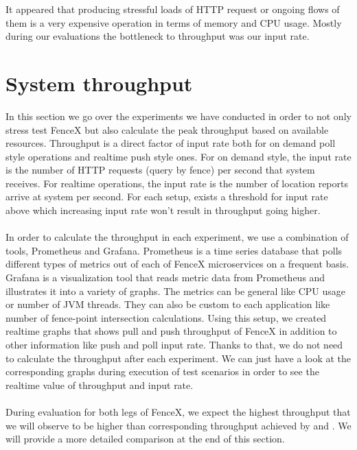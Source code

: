 \documentclass[a4]{report}
\begin{document}
    It appeared that producing stressful loads of HTTP request or ongoing flows of them is a very expensive operation
    in terms of memory and CPU usage.
    Mostly during our evaluations the bottleneck to throughput was our input rate.


    \section{System throughput}
    In this section we go over the experiments we have conducted in order to not only stress test FenceX but also
    calculate the peak throughput based on available resources.
    Throughput is a direct factor of input rate both for on demand poll style operations and realtime push style ones.
    For on demand style, the input rate is the number of HTTP requests (query by fence) per second that system receives.
    For realtime operations, the input rate is the number of location reports arrive at system per second.
    For each setup, exists a threshold for input rate above which increasing input rate won't result in throughput going higher.

    \paragraph{}
    In order to calculate the throughput in each experiment, we use a combination of tools, Prometheus and
    Grafana\cite{grafana}.
    Prometheus is a time series database that polls different types of metrics out of each of FenceX microservices on
    a frequent basis.
    Grafana is a visualization tool that reads metric data from Prometheus and illustrates it into a variety of graphs.
    The metrics can be general like CPU usage or number of JVM threads.
    They can also be custom to each application like number of fence-point intersection calculations.
    Using this setup, we created realtime graphs that shows pull and push throughput of FenceX in addition to other
    information like push and poll input rate.
    Thanks to that, we do not need to calculate the throughput after each experiment.
    We can just have a look at the corresponding graphs during execution of test scenarios in order to see the realtime
    value of throughput and input rate.

    \paragraph{}
    During evaluation for both legs of FenceX, we expect the highest throughput that we will observe to be higher
    than corresponding throughput achieved by \cite{Nechifor_Comnac_2013} and
    \cite{Cirillo-Jacobs-Martin-Szczytowski-2014}.
    We will provide a more detailed comparison at the end of this section.
\end{document}
